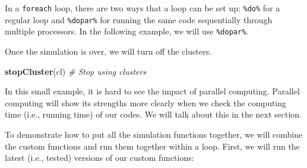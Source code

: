 \documentclass[
]{book}
\newenvironment{Shaded}{\begin{snugshade}}{\end{snugshade}}
\newcommand{\CommentTok}[1]{\textcolor[rgb]{0.56,0.35,0.01}{\textit{#1}}}
\newcommand{\DataTypeTok}[1]{\textcolor[rgb]{0.13,0.29,0.53}{#1}}
\newcommand{\DecValTok}[1]{\textcolor[rgb]{0.00,0.00,0.81}{#1}}
\newcommand{\KeywordTok}[1]{\textcolor[rgb]{0.13,0.29,0.53}{\textbf{#1}}}
\newcommand{\NormalTok}[1]{#1}
\newcommand{\OperatorTok}[1]{\textcolor[rgb]{0.81,0.36,0.00}{\textbf{#1}}}
\newcommand{\StringTok}[1]{\textcolor[rgb]{0.31,0.60,0.02}{#1}}
\begin{document}
In a \texttt{foreach} loop, there are two ways that a loop can be set up: \texttt{\%do\%} for a regular loop and \texttt{\%dopar\%} for running the same code sequentially through multiple processors. In the following example, we will use \texttt{\%dopar\%}.

\begin{Shaded}
\end{Shaded}

Once the simulation is over, we will turn off the clusters.

\begin{Shaded}
\begin{Highlighting}[]
\KeywordTok{stopCluster}\NormalTok{(cl) }\CommentTok{# Stop using clusters}
\end{Highlighting}
\end{Shaded}

In this small example, it is hard to see the impact of parallel computing. Parallel computing will show its strengths more clearly when we check the computing time (i.e., running time) of our codes. We will talk about this in the next section.

To demonstrate how to put all the simulation functions together, we will combine the custom functions and run them together within a loop. First, we will run the latest (i.e., tested) versions of our custom functions:
\end{document}
